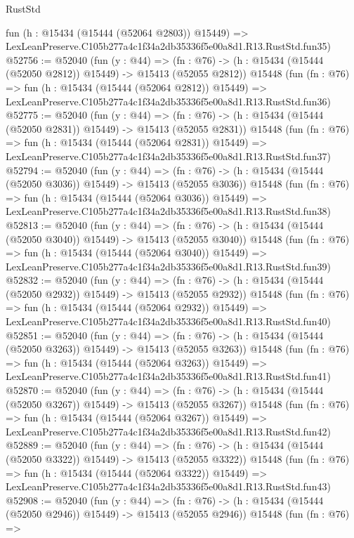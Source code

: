 \begin{lexlean}{RustStd}
\begin{coremodule}
    fun (h : @15434 (@15444 (@52064 @2803)) @15449) =>
    LexLeanPreserve.C105b277a4c1f34a2db35336f5e00a8d1.R13.RustStd.fun35)
@52756 := @52040
    (fun (y : @44) =>
    (fn : @76) -> (h : @15434 (@15444 (@52050 @2812)) @15449) -> @15413 (@52055 @2812))
    @15448
    (fun (fn : @76) =>
    fun (h : @15434 (@15444 (@52064 @2812)) @15449) =>
    LexLeanPreserve.C105b277a4c1f34a2db35336f5e00a8d1.R13.RustStd.fun36)
@52775 := @52040
    (fun (y : @44) =>
    (fn : @76) -> (h : @15434 (@15444 (@52050 @2831)) @15449) -> @15413 (@52055 @2831))
    @15448
    (fun (fn : @76) =>
    fun (h : @15434 (@15444 (@52064 @2831)) @15449) =>
    LexLeanPreserve.C105b277a4c1f34a2db35336f5e00a8d1.R13.RustStd.fun37)
@52794 := @52040
    (fun (y : @44) =>
    (fn : @76) -> (h : @15434 (@15444 (@52050 @3036)) @15449) -> @15413 (@52055 @3036))
    @15448
    (fun (fn : @76) =>
    fun (h : @15434 (@15444 (@52064 @3036)) @15449) =>
    LexLeanPreserve.C105b277a4c1f34a2db35336f5e00a8d1.R13.RustStd.fun38)
@52813 := @52040
    (fun (y : @44) =>
    (fn : @76) -> (h : @15434 (@15444 (@52050 @3040)) @15449) -> @15413 (@52055 @3040))
    @15448
    (fun (fn : @76) =>
    fun (h : @15434 (@15444 (@52064 @3040)) @15449) =>
    LexLeanPreserve.C105b277a4c1f34a2db35336f5e00a8d1.R13.RustStd.fun39)
@52832 := @52040
    (fun (y : @44) =>
    (fn : @76) -> (h : @15434 (@15444 (@52050 @2932)) @15449) -> @15413 (@52055 @2932))
    @15448
    (fun (fn : @76) =>
    fun (h : @15434 (@15444 (@52064 @2932)) @15449) =>
    LexLeanPreserve.C105b277a4c1f34a2db35336f5e00a8d1.R13.RustStd.fun40)
@52851 := @52040
    (fun (y : @44) =>
    (fn : @76) -> (h : @15434 (@15444 (@52050 @3263)) @15449) -> @15413 (@52055 @3263))
    @15448
    (fun (fn : @76) =>
    fun (h : @15434 (@15444 (@52064 @3263)) @15449) =>
    LexLeanPreserve.C105b277a4c1f34a2db35336f5e00a8d1.R13.RustStd.fun41)
@52870 := @52040
    (fun (y : @44) =>
    (fn : @76) -> (h : @15434 (@15444 (@52050 @3267)) @15449) -> @15413 (@52055 @3267))
    @15448
    (fun (fn : @76) =>
    fun (h : @15434 (@15444 (@52064 @3267)) @15449) =>
    LexLeanPreserve.C105b277a4c1f34a2db35336f5e00a8d1.R13.RustStd.fun42)
@52889 := @52040
    (fun (y : @44) =>
    (fn : @76) -> (h : @15434 (@15444 (@52050 @3322)) @15449) -> @15413 (@52055 @3322))
    @15448
    (fun (fn : @76) =>
    fun (h : @15434 (@15444 (@52064 @3322)) @15449) =>
    LexLeanPreserve.C105b277a4c1f34a2db35336f5e00a8d1.R13.RustStd.fun43)
@52908 := @52040
    (fun (y : @44) =>
    (fn : @76) -> (h : @15434 (@15444 (@52050 @2946)) @15449) -> @15413 (@52055 @2946))
    @15448
    (fun (fn : @76) =>

\end{coremodule}
\end{lexlean}
